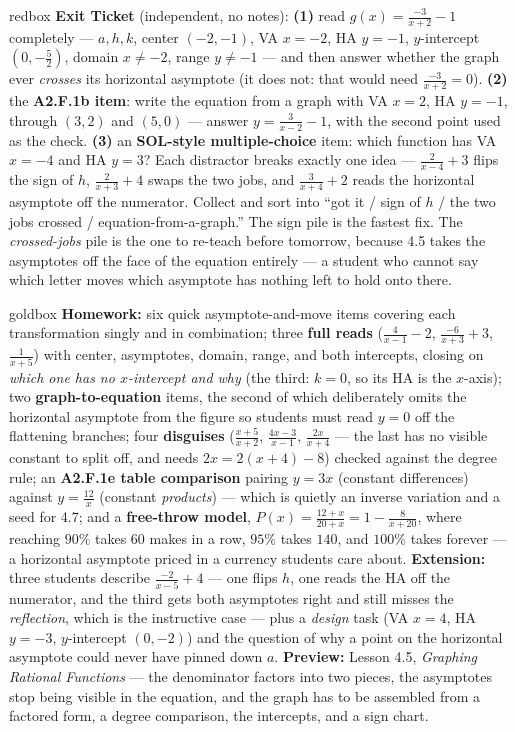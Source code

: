 \documentclass[10pt]{article}
\begin{document}
\begin{skillbox}{redbox}
\textbf{Exit Ticket} (independent, no notes): \textbf{(1)} read $g(x)=\frac{-3}{x+2}-1$ completely ---
$a,h,k$, center $(-2,-1)$, VA $x=-2$, HA $y=-1$, $y$-intercept $(0,-\frac52)$, domain $x\neq-2$, range
$y\neq-1$ --- and then answer whether the graph ever \emph{crosses} its horizontal asymptote (it does
not: that would need $\frac{-3}{x+2}=0$). \textbf{(2)} the \textbf{A2.F.1b item}: write the equation
from a graph with VA $x=2$, HA $y=-1$, through $(3,2)$ and $(5,0)$ --- answer $y=\frac{3}{x-2}-1$, with
the second point used as the check. \textbf{(3)} an \textbf{SOL-style multiple-choice} item: which
function has VA $x=-4$ and HA $y=3$? Each distractor breaks exactly one idea --- $\frac{2}{x-4}+3$
flips the sign of $h$, $\frac{2}{x+3}+4$ swaps the two jobs, and $\frac{3}{x+4}+2$ reads the horizontal
asymptote off the numerator. Collect and sort into ``got it / sign of $h$ / the two jobs crossed /
equation-from-a-graph.'' The sign pile is the fastest fix. The \emph{crossed-jobs} pile is the one to
re-teach before tomorrow, because 4.5 takes the asymptotes off the face of the equation entirely --- a
student who cannot say which letter moves which asymptote has nothing left to hold onto there.
\end{skillbox}

\begin{skillbox}{goldbox}
\textbf{Homework:} six quick asymptote-and-move items covering each transformation singly and in
combination; three \textbf{full reads} ($\frac{4}{x-1}-2$, $\frac{-6}{x+3}+3$, $\frac{1}{x+5}$) with
center, asymptotes, domain, range, and both intercepts, closing on \emph{which one has no $x$-intercept
and why} (the third: $k=0$, so its HA is the $x$-axis); two \textbf{graph-to-equation} items, the
second of which deliberately omits the horizontal asymptote from the figure so students must read
$y=0$ off the flattening branches; four \textbf{disguises} ($\frac{x+5}{x+2}$, $\frac{4x-3}{x-1}$,
$\frac{2x}{x+4}$ --- the last has no visible constant to split off, and needs $2x=2(x+4)-8$) checked
against the degree rule; an \textbf{A2.F.1e table comparison} pairing $y=3x$ (constant differences)
against $y=\frac{12}{x}$ (constant \emph{products}) --- which is quietly an inverse variation and a seed
for 4.7; and a \textbf{free-throw model}, $P(x)=\frac{12+x}{20+x}=1-\frac{8}{x+20}$, where reaching
$90\%$ takes $60$ makes in a row, $95\%$ takes $140$, and $100\%$ takes forever --- a horizontal
asymptote priced in a currency students care about. \textbf{Extension:} three students describe
$\frac{-2}{x-5}+4$ --- one flips $h$, one reads the HA off the numerator, and the third gets both
asymptotes right and still misses the \emph{reflection}, which is the instructive case --- plus a
\emph{design} task (VA $x=4$, HA $y=-3$, $y$-intercept $(0,-2)$) and the question of why a point on the
horizontal asymptote could never have pinned down $a$. \textbf{Preview:} Lesson 4.5, \emph{Graphing
Rational Functions} --- the denominator factors into two pieces, the asymptotes stop being visible in
the equation, and the graph has to be assembled from a factored form, a degree comparison, the
intercepts, and a sign chart.
\end{skillbox}
\end{document}
